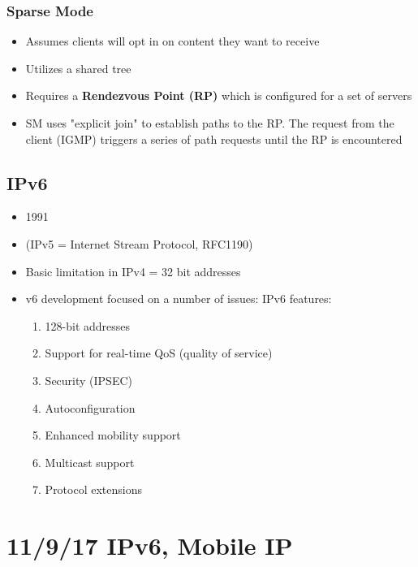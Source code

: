 \documentclass[11pt]{article}
\begin{document}
\subsubsection{Sparse Mode}
\label{sec:orgheadline106}
\begin{itemize}
\item Assumes clients will opt in on content they want to receive
\item Utilizes a shared tree
\item Requires a \textbf{Rendezvous Point (RP)} which is configured for a set of
servers
\item SM uses "explicit join" to establish paths to the RP. The request
from the client (IGMP) triggers a series of path requests until the
RP is encountered
\end{itemize}

\subsection{IPv6}
\label{sec:orgheadline108}
\begin{itemize}
\item 1991
\item (IPv5 = Internet Stream Protocol, RFC1190)
\item Basic limitation in IPv4 = 32 bit addresses
\item v6 development focused on a number of issues: IPv6 features:
\begin{enumerate}
\item 128-bit addresses
\item Support for real-time QoS (quality of service)
\item Security (IPSEC)
\item Autoconfiguration
\item Enhanced mobility support
\item Multicast support
\item Protocol extensions
\end{enumerate}
\end{itemize}

\section{11/9/17  IPv6, Mobile IP}
\label{sec:orgheadline117}
\end{document}
